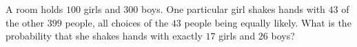 A room holds $100$ girls and $300$ boys. One particular girl shakes hands with $43$ of the other $399$ people, all choices of the $43$ people being equally likely. What is the probability that she shakes hands with exactly $17$ girls and $26$ boys?
